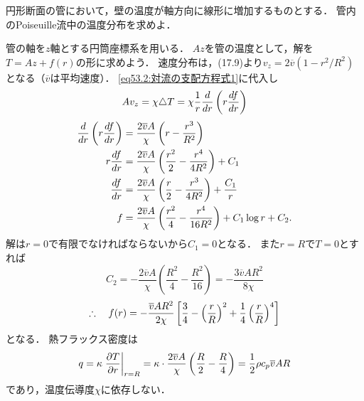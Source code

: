 \begin{mondai}{}{}
円形断面の管において，壁の温度が軸方向に線形に増加するものとする．
管内のPoiseuille流中の温度分布を求めよ．
\end{mondai}
\begin{kaitou}
管の軸を$z$軸とする円筒座標系を用いる．
$Az$を管の温度として，解を$T=Az + f(r)$の形に求めよう．
速度分布は，(17.9)より$v_z = 2\overline{v} (1-r^2/R^2)$となる（$\overline{v}$は平均速度）．
\eqref{eq53.2:対流の支配方程式1}に代入し
\[
    Av_z = \chi \triangle T = \chi \frac{1}{r} \dv{r} \left( r \dv{f}{r} \right)
\]
\begin{align*}
    \dv{r} \left( r \dv{f}{r} \right) &= \frac{2\overline{v}A}{\chi} \left( r - \frac{r^3}{R^2} \right) \\
    r \dv{f}{r} &= \frac{2\overline{v}A}{\chi} \left( \frac{r^2}{2} - \frac{r^4}{4R^2} \right) + C_1 \\
    \dv{f}{r} &= \frac{2\overline{v}A}{\chi} \left( \frac{r}{2} - \frac{r^3}{4R^2} \right) + \frac{C_1}{r} \\
    f &= \frac{2\overline{v}A}{\chi} \left( \frac{r^2}{4} - \frac{r^4}{16R^2} \right) + C_1 \log r + C_2 .
\end{align*}
解は$r=0$で有限でなければならないから$C_1=0$となる．
また$r=R$で$T=0$とすれば
\[
    C_2 = -\frac{2\overline{v}A}{\chi} \left( \frac{R^2}{4} - \frac{R^2}{16} \right) = -\frac{3\overline{v}AR^2}{8\chi}
\]
\[
    \therefore\quad f(r) = -\frac{\overline{v}AR^2}{2\chi} \left[ \frac{3}{4} - \left( \frac{r}{R} \right)^2 + \frac{1}{4} \left( \frac{r}{R} \right)^4 \right]
\]
となる．
熱フラックス密度は
\[
    q = \kappa \eval{\pdv{T}{r}}_{r=R}
    = \kappa \cdot \frac{2\overline{v}A}{\chi} \left( \frac{R}{2} - \frac{R}{4} \right) 
    = \frac{1}{2} \rho c_p \overline{v} AR
\]
であり，温度伝導度$\chi$に依存しない．








\end{kaitou}


\BackToTheToc